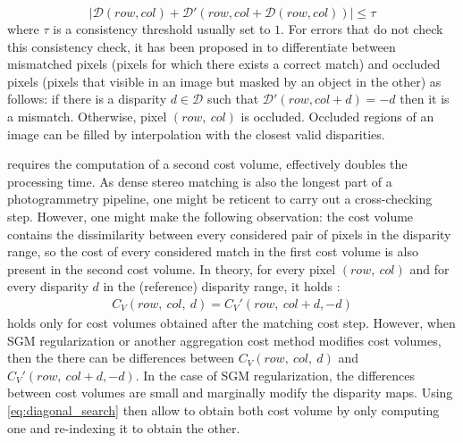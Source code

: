 \begin{equation}\label{eq:cross-checking}
    |\mathcal{D}(row, col) + \mathcal{D}'(row, col+\mathcal{D}(row, col))|\leqslant \tau
\end{equation}
where $\tau$ is a consistency threshold usually set to $1$. For errors that do not check this consistency check, it has been proposed in \cite{hirschmuller_stereo_2008} to differentiate between mismatched pixels (pixels for which there exists a correct match) and occluded pixels (pixels that visible in an image but masked by an object in the other) as follows: if there is a disparity $d\in\mathcal{D}$ such that $\mathcal{D}'(row, col+d)=-d$ then it is a mismatch. Otherwise, pixel $(row, ~col)$ is occluded. Occluded regions of an image can be filled by interpolation with the closest valid disparities.  

\begin{remark}
      requires the computation of a second cost volume, effectively doubles the processing time. As dense stereo matching is also the longest part of a photogrammetry pipeline, one might be reticent to carry out a cross-checking step. However, one might make the following observation: the cost volume contains the dissimilarity between every considered pair of pixels in the disparity range, so the cost of every considered match in the first cost volume is also present in the second cost volume. In theory, for every pixel $(row, ~col)$ and for every disparity $d$ in the (reference) disparity range, it holds \cite{bebis_mutual_2008}:
     \begin{align}\label{eq:diagonal_search}
         C_V(row,~col,~d) = C_V'(row,~col+d, -d)
     \end{align}
      holds only for cost volumes obtained after the matching cost step. However, when SGM regularization or another aggregation cost method modifies cost volumes, then the there can be differences between $C_V(row,~col,~d)$ and $C_V'(row,~col+d, -d)$. In the case of SGM regularization, the differences between cost volumes are small and marginally modify the disparity maps. Using \eqref{eq:diagonal_search} then allow to obtain both cost volume by only computing one and re-indexing it to obtain the other. 
\end{remark}

